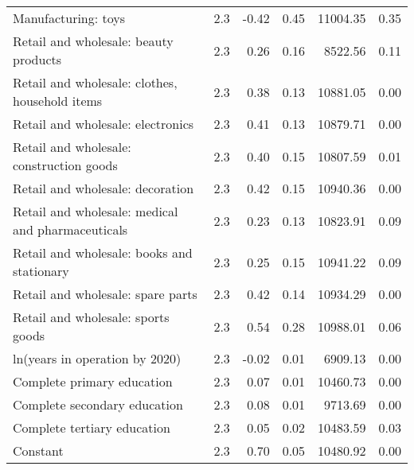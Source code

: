 \begin{longtable}{llrrrr}
  Manufacturing: toys & 2.3 & -0.42 & 0.45 & 11004.35 & 0.35 \\ 
  Retail and wholesale: beauty products & 2.3 & 0.26 & 0.16 & 8522.56 & 0.11 \\ 
  Retail and wholesale: clothes, household items & 2.3 & 0.38 & 0.13 & 10881.05 & 0.00 \\ 
  Retail and wholesale: electronics & 2.3 & 0.41 & 0.13 & 10879.71 & 0.00 \\ 
  Retail and wholesale: construction goods & 2.3 & 0.40 & 0.15 & 10807.59 & 0.01 \\ 
  Retail and wholesale: decoration & 2.3 & 0.42 & 0.15 & 10940.36 & 0.00 \\ 
  Retail and wholesale: medical and pharmaceuticals & 2.3 & 0.23 & 0.13 & 10823.91 & 0.09 \\ 
  Retail and wholesale: books and stationary & 2.3 & 0.25 & 0.15 & 10941.22 & 0.09 \\ 
  Retail and wholesale: spare parts & 2.3 & 0.42 & 0.14 & 10934.29 & 0.00 \\ 
  Retail and wholesale: sports goods & 2.3 & 0.54 & 0.28 & 10988.01 & 0.06 \\ 
  ln(years in operation by 2020) & 2.3 & -0.02 & 0.01 & 6909.13 & 0.00 \\ 
  Complete primary education & 2.3 & 0.07 & 0.01 & 10460.73 & 0.00 \\ 
  Complete secondary education & 2.3 & 0.08 & 0.01 & 9713.69 & 0.00 \\ 
  Complete tertiary education & 2.3 & 0.05 & 0.02 & 10483.59 & 0.03 \\ 
  Constant & 2.3 & 0.70 & 0.05 & 10480.92 & 0.00 \\ 
   \hline
\hline
\end{longtable}
